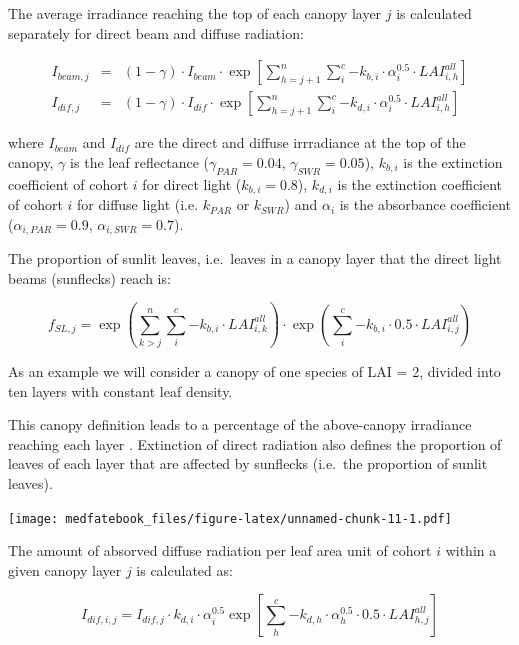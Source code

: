 \documentclass[]{book}
\begin{document}
The average irradiance reaching the top of each canopy layer \(j\) is
calculated separately for direct beam and diffuse radiation:

\begin{eqnarray}
I_{beam,j} &=& (1 - \gamma) \cdot I_{beam} \cdot \exp\left[ \sum_{h=j+1}^{n}{\sum_{i}^{c}{-k_{b,i}\cdot \alpha_i^{0.5}\cdot LAI^{all}_{i,h}}}\right]\\
I_{dif,j} &=& (1 - \gamma) \cdot I_{dif} \cdot \exp\left[ \sum_{h=j+1}^{n}{\sum_{i}^{c}{-k_{d,i}\cdot \alpha_i^{0.5}\cdot LAI^{all}_{i,h}}}\right]
\end{eqnarray}

where \(I_{beam}\) and \(I_{dif}\) are the direct and diffuse
irrradiance at the top of the canopy, \(\gamma\) is the leaf reflectance
(\(\gamma_{PAR} = 0.04\), \(\gamma_{SWR} = 0.05\)), \(k_{b,i}\) is the
extinction coefficient of cohort \(i\) for direct light
(\(k_{b,i} = 0.8\)), \(k_{d,i}\) is the extinction coefficient of cohort
\(i\) for diffuse light (i.e. \(k_{PAR}\) or \(k_{SWR}\)) and
\(\alpha_i\) is the absorbance coefficient (\(\alpha_{i,PAR} = 0.9\),
\(\alpha_{i,SWR} = 0.7\)).

The proportion of sunlit leaves, i.e.~leaves in a canopy layer that the
direct light beams (sunflecks) reach is:

\begin{equation}
f_{SL, j}  = \exp\left( \sum_{k>j}^{n}{\sum_{i}^{c}{-k_{b,i} \cdot LAI^{all}_{i,k}}}\right) \cdot \exp\left( \sum_{i}^{c}{-k_{b,i} \cdot 0.5\cdot LAI^{all}_{i,j}}\right)
\end{equation}

As an example we will consider a canopy of one species of LAI = 2,
divided into ten layers with constant leaf density.

This canopy definition leads to a percentage of the above-canopy
irradiance reaching each layer \citep{Anten2016}. Extinction of direct
radiation also defines the proportion of leaves of each layer that are
affected by sunflecks (i.e.~the proportion of sunlit leaves).

\texttt{[image: medfatebook\_files/figure-latex/unnamed-chunk-11-1.pdf]}

The amount of absorved diffuse radiation per leaf area unit of cohort
\(i\) within a given canopy layer \(j\) is calculated as:

\begin{equation}
I_{dif,i,j} = I_{dif,j} \cdot k_{d,i} \cdot \alpha_i^{0.5} \exp\left[ \sum_{h}^{c}{-k_{d,h}\cdot \alpha_h^{0.5}\cdot 0.5\cdot LAI^{all}_{h,j}}\right]
\end{equation}
\end{document}
